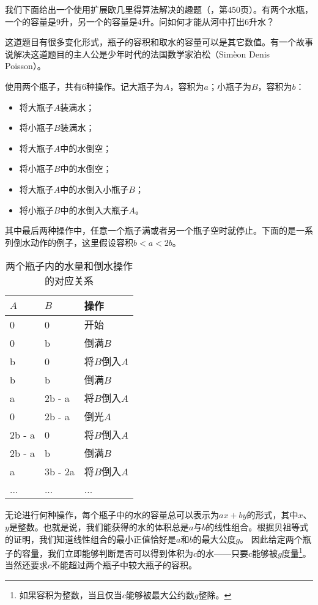 \documentclass{article}
\begin{document}
我们下面给出一个使用扩展欧几里得算法解决的趣题（\cite{LiuXinyu2017}，第450页）。有两个水瓶，一个的容量是9升，另一个的容量是4升。问如何才能从河中打出6升水？

这道题目有很多变化形式，瓶子的容积和取水的容量可以是其它数值。有一个故事说解决这道题目的主人公是少年时代的法国数学家泊松（Sim\`{e}on Denis Poisson）。

使用两个瓶子，共有6种操作。记大瓶子为$A$，容积为$a$；小瓶子为$B$，容积为$b$：

\begin{itemize}
\item 将大瓶子$A$装满水；
\item 将小瓶子$B$装满水；
\item 将大瓶子$A$中的水倒空；
\item 将小瓶子$B$中的水倒空；
\item 将大瓶子$A$中的水倒入小瓶子$B$；
\item 将小瓶子$B$中的水倒入大瓶子$A$。
\end{itemize}

其中最后两种操作中，任意一个瓶子满或者另一个瓶子空时就停止。下面的是一系列倒水动作的例子，这里假设容积$b < a < 2b$。

\begin{table}[htbp]
\centering
\begin{tabular}{l|l|l}
$A$ & $B$ & 操作 \\
\hline
0 & 0 & 开始 \\
0 & b & 倒满$B$ \\
b & 0 & 将$B$倒入$A$ \\
b & b & 倒满$B$ \\
a & 2b - a & 将$B$倒入$A$ \\
0 & 2b - a & 倒光$A$ \\
2b - a & 0 & 将$B$倒入$A$ \\
2b - a & b & 倒满$B$ \\
a & 3b - 2a & 将$B$倒入$A$ \\
... & ... & ... \\
\end{tabular}
\caption{两个瓶子内的水量和倒水操作的对应关系} \label{tab:jug-ops}
\end{table}

无论进行何种操作，每个瓶子中的水的容量总可以表示为$ax + by$的形式，其中$x$、$y$是整数。也就是说，我们能获得的水的体积总是$a$与$b$的线性组合。根据贝祖等式的证明，我们知道线性组合的最小正值恰好是$a$和$b$的最大公度$g$。
因此给定两个瓶子的容量，我们立即能够判断是否可以得到体积为$c$的水——只要$c$能够被$g$度量\footnote{如果容积为整数，当且仅当$c$能够被最大公约数$g$整除。}。当然还要求$c$不能超过两个瓶子中较大瓶子的容积。
\end{document}
